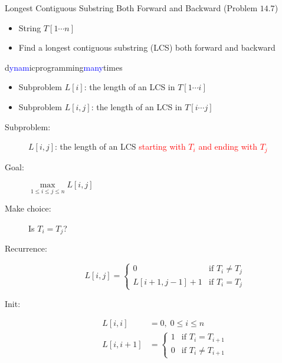 \begin{frame}{}
  \begin{exampleblock}{Longest Contiguous Substring Both Forward and Backward (Problem $14.7$)}
    \begin{itemize}
      \item String $T[1 \cdots n]$
      \item Find a longest contiguous substring (LCS) both forward and backward
    \end{itemize}
  \end{exampleblock}

  \begin{center}
    d\textcolor{blue}{ynam}icprogramming\textcolor{blue}{many}times
  \end{center}

  \begin{itemize}
    \item Subproblem $L[i]$: the length of an LCS in $T[1 \cdots i]$
    \item Subproblem $L[i,j]$: the length of an LCS in $T[i \cdots j]$
  \end{itemize}
\end{frame}
\begin{frame}{}
  \begin{description}
	\item[Subproblem:] $L[i,j]$: the length of an LCS \textcolor{red}{starting with $T_{i}$ and ending with $T_{j}$}
	\item[Goal:] $\max\limits_{1 \le i \le j \le n} L[i,j]$
	  \pause
	\item[Make choice:] Is $T_{i} = T_{j}$?
	\item[Recurrence:] 
	  \begin{displaymath}
		L[i,j] = \left\{ \begin{array}{ll}
		  0 & \textrm{if $T_{i} \neq T_{j}$}  \\
		  L[i+1,j-1] + 1 & \textrm{if $T_{i} = T_{j}$}
		\end{array} \right.
	  \end{displaymath}
	  \pause
	\item[Init:]
	  \begin{align*}
		L[i,i] &= 0, \; 0 \le i \le n  \\
		L[i,i+1] &= \left\{ \begin{array}{ll}
		  1 & \text{if } T_{i} = T_{i+1}  \\
		  0 & \text{if } T_{i} \neq T_{i+1}
		  \end{array} \right.
	  \end{align*}
  \end{description}
\end{frame}

